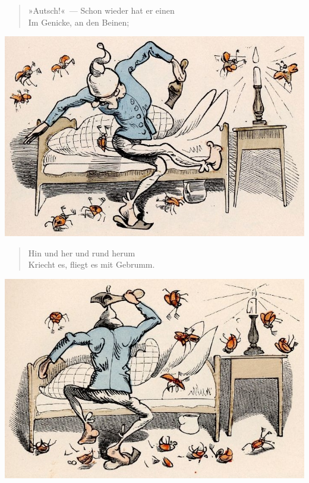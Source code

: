 \documentclass[a4paper,12pt]{article}
\begin{document}
\begin{verse}
»Autsch!«~— Schon wieder hat er einen\\{}
Im Genicke, an den Beinen;
\end{verse}



\begin{center}\includegraphics[scale=.7, alt={... und fliegt}]{images/5-12.jpg}\end{center}



\begin{verse}
Hin und her und rund herum\\{}
Kriecht es, fliegt es mit Gebrumm.
\end{verse}



\begin{center}\includegraphics[scale=.7, alt={Onkel Fritz haut}]{images/5-13.jpg}\end{center}
\end{document}

